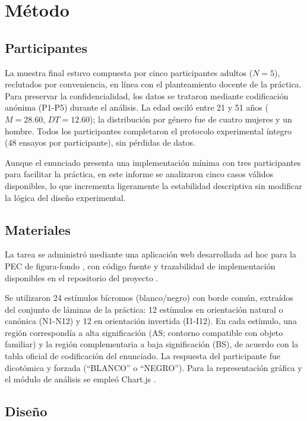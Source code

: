 \documentclass[stu, 12pt, letterpaper, donotrepeattitle, floatsintext, natbib]{apa7}
\begin{document}
\section{Método}

\subsection{Participantes}

La muestra final estuvo compuesta por cinco participantes adultos (\(N=5\)), reclutados por conveniencia, en línea con el planteamiento docente de la práctica. Para preservar la confidencialidad, los datos se trataron mediante codificación anónima (P1-P5) durante el análisis. La edad osciló entre 21 y 51 años (\(M = 28.60\), \(DT = 12.60\)); la distribución por género fue de cuatro mujeres y un hombre. Todos los participantes completaron el protocolo experimental íntegro (48 ensayos por participante), sin pérdidas de datos.

Aunque el enunciado presenta una implementación mínima con tres participantes para facilitar la práctica, en este informe se analizaron cinco casos válidos disponibles, lo que incrementa ligeramente la estabilidad descriptiva sin modificar la lógica del diseño experimental.

\subsection{Materiales}

La tarea se administró mediante una aplicación web desarrollada ad hoc para la PEC de figura-fondo \cite{amaya2026web}, con código fuente y trazabilidad de implementación disponibles en el repositorio del proyecto \cite{amaya2026repo}. 

Se utilizaron 24 estímulos bícromos (blanco/negro) con borde común, extraídos del conjunto de láminas de la práctica: 12 estímulos en orientación natural o canónica (N1-N12) y 12 en orientación invertida (I1-I12). En cada estímulo, una región correspondía a alta significación (AS; contorno compatible con objeto familiar) y la región complementaria a baja significación (BS), de acuerdo con la tabla oficial de codificación del enunciado. La respuesta del participante fue dicotómica y forzada (``BLANCO'' o ``NEGRO''). Para la representación gráfica y el módulo de análisis se empleó Chart.js \cite{chartjs}.

\subsection{Diseño}
\end{document}
